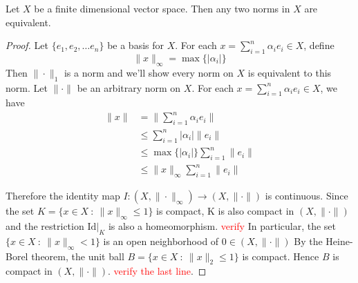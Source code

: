 \begin{corollary}
  Let $X$ be a finite dimensional vector space. Then any two norms in $X$ are equivalent.
\end{corollary}
\begin{proof}
  Let $\{ e_1, e_2, \ldots e_n \}$ be a basis for $X$. For each $x = \sum_{i = 1}^{n} \alpha_i e_i \in X$, define \[
       \|x\|_\infty = \max \{ |\alpha_i| \}
  \]
  Then $\|\cdot\|_1$ is a norm and we'll show every norm on $X$ is equivalent to this norm. Let $\|\cdot\|$ be an arbitrary norm on $X$. For each $x = \sum_{i = 1}^{n} \alpha_i e_i \in X$, we have
  \begin{align*}
    \|x\| &= \|\sum_{i = 1}^{n} \alpha_i e_i\| \\ 
        & \le \sum_{i = 1}^{n} |\alpha_i|\|e_i\| \\ 
        &\le \max \{ |\alpha_i| \} \sum_{i = 1}^{n} \|e_i\| \\ 
        & \le \|x\|_\infty \sum_{i = 1}^{n} \|e_i\|
  \end{align*}

  Therefore the identity map $I: (X, \|\cdot\|_\infty) \to (X, \|\cdot\|)$ is continuous. Since the set $ K = \{ x \in X \ : \ \|x\|_\infty \le 1 \}$ is compact,  K is also compact in $(X, \|\cdot\|)$ and the restriction $\textrm{Id}|_K$ is also a homeomorphism. \textcolor{red}{verify}
  In particular, the set $\{ x \in X  \ : \  \|x\|_\infty < 1 \}$ is an open neighborhood of $0 \in (X, \|\cdot\|)$
  By the Heine-Borel theorem, the unit ball $B = \{ x \in X  \ : \  \|x\|_2 \le 1 \}$ is compact. Hence $B$ is compact in $(X, \|\cdot\|)$. \textcolor{red}{verify the last line}.
\end{proof}
